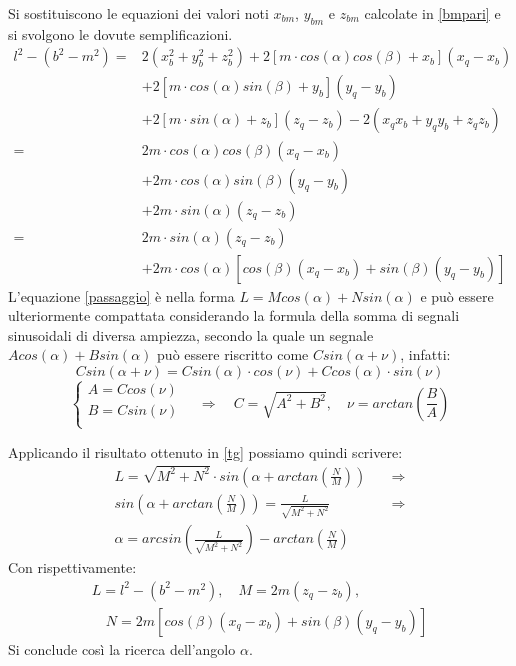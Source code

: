 \documentclass[12pt,twoside,openright]{report}
\begin{document}
Si sostituiscono le equazioni dei valori noti $x_{bm}$, $y_{bm}$ e $z_{bm}$ calcolate in \eqref{bmpari} e si svolgono le dovute semplificazioni.
\begin{align}\label{passaggio}
    l^2-(b^2-m^2) =& 2(x_{b}^2+y_{b}^2+z_{b}^2)+2[m \cdot cos(\alpha)cos(\beta)+x_b](x_q-x_b)\nonumber\\
    &+2[m \cdot cos(\alpha)sin(\beta)+y_b](y_q-y_b)
    \nonumber\\ &+2[m \cdot sin(\alpha)+z_b](z_q-z_b)-2(x_qx_b+y_qy_b+z_qz_b)\nonumber\\
    				   =& 2m \cdot cos(\alpha)cos(\beta)(x_q-x_b)\nonumber\\&+2m \cdot cos(\alpha)sin(\beta)(y_q-y_b)\nonumber\\
    				   & +2m \cdot sin(\alpha)(z_q-z_b)\nonumber\\
    				   =& 2m \cdot sin(\alpha)(z_q-z_b) \nonumber\\
    				   &+2m \cdot cos(\alpha)[cos(\beta)(x_q-x_b)+sin(\beta)(y_q-y_b)]   
\end{align}
L'equazione \eqref{passaggio} è nella forma $L=Mcos(\alpha)+Nsin(\alpha)$ e può essere ulteriormente compattata considerando la formula della somma di segnali sinusoidali di diversa ampiezza, secondo la quale un segnale $Acos(\alpha)+Bsin(\alpha)$ può essere riscritto come $Csin(\alpha + \nu)$, infatti:
\begin{equation}\label{c}
Csin(\alpha + \nu)=Csin(\alpha)\cdot cos(\nu)+Ccos(\alpha)\cdot sin(\nu)\nonumber
\end{equation}
\begin{equation}\label{tg}
    \begin{cases}
      A=Ccos(\nu)\\
      B=Csin(\nu)\\
    \end{cases}\quad \Rightarrow \quad  C=\sqrt{A^2+B^2}, \quad \nu=arctan\left(\frac{B}{A}\right)
\end{equation}

Applicando il risultato ottenuto in \eqref{tg} possiamo quindi scrivere:
\begin{align}\label{alfa}
    L= \sqrt{M^2+N^2}\cdot sin\left(\alpha+arctan\left(\frac{N}{M}\right)\right) \quad  &\Rightarrow\nonumber\\ sin\left(\alpha+arctan\left(\frac{N}{M}\right)\right)=\frac{L}{\sqrt{M^2+N^2}}  \quad  &\Rightarrow\nonumber\\
    \alpha=arcsin\left(\frac{L}{\sqrt{M^2+N^2}}\right)-arctan\left(\frac{N}{M}\right)
\end{align}
Con rispettivamente:
\begin{align}\label{lnm}
L=l^2-(b^2-m^2), \quad M=2m(z_q-z_b),\nonumber \\ \quad N=2m[cos(\beta)(x_q-x_b)+sin(\beta)(y_q-y_b)]
\end{align}
Si conclude così la ricerca dell'angolo $\alpha$.
\end{document}
